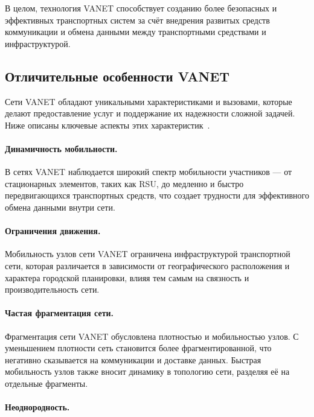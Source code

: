 В целом, технология VANET способствует созданию более безопасных и эффективных транспортных систем за счёт внедрения развитых средств коммуникации и обмена данными между транспортными средствами и инфраструктурой.

\subsection{Отличительные особенности VANET}

Сети VANET обладают уникальными характеристиками и вызовами, которые делают предоставление услуг и поддержание их надежности сложной задачей. Ниже описаны ключевые аспекты этих характеристик~\cite{hamdi2020review,karagiannis2011vehicular,raw2013security}.

\paragraph{Динамичность мобильности.}

В сетях VANET наблюдается широкий спектр мобильности участников --- от стационарных элементов, таких как RSU, до медленно и быстро передвигающихся транспортных средств, что создает трудности для эффективного обмена данными внутри сети.

\paragraph{Ограничения движения.}

Мобильность узлов сети VANET ограничена инфраструктурой транспортной сети, которая различается в зависимости от географического расположения и характера городской планировки, влияя тем самым на связность и производительность сети.

\paragraph{Частая фрагментация сети.}

Фрагментация сети VANET обусловлена плотностью и мобильностью узлов. С уменьшением плотности сеть становится более фрагментированной, что негативно сказывается на коммуникации и доставке данных. Быстрая мобильность узлов также вносит динамику в топологию сети, разделяя её на отдельные фрагменты.

\paragraph{Неоднородность.} 

